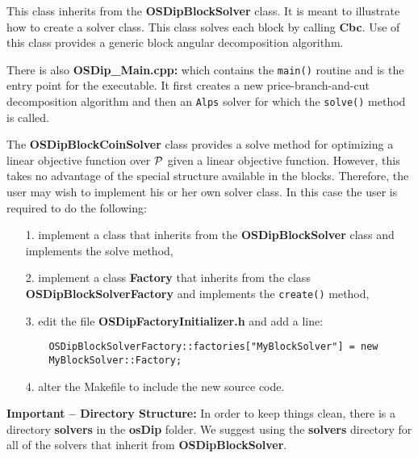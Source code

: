   
\vskip 8pt
  This class inherits from the {\bf
OSDipBlockSolver} class. It is meant to illustrate how to create a solver class.
This class solves each block by calling {\bf Cbc}.  Use of this class provides a
generic block angular decomposition algorithm.



\vskip 8pt
There is also  {\bf OSDip\_Main.cpp:} which contains the {\tt main()} routine and is
the entry point for the executable. It first creates a new price-branch-and-cut
decomposition algorithm and then an {\tt Alps} solver for which the {\tt solve()}
method is called. 


\label{section:userreq}


The {\bf OSDipBlockCoinSolver} class provides a solve method for optimizing a
linear objective function over ${\cal P}$ given a linear objective function.
However, this takes no advantage of the special structure available in the
blocks. Therefore, the user may wish to implement his or her own solver class.
In this case the user is required to do the following:
 
 \begin{itemize}
   
   \item[1.] implement a class that inherits from the {\bf OSDipBlockSolver}
   class and implements the solve method,
   
   \item[2.] implement a class {\bf Factory} that inherits from the class {\bf
OSDipBlockSolverFactory} and implements the {\tt create()} method,

	\item[3.] edit the file {\bf OSDipFactoryInitializer.h} and add a line:
	
	\begin{verbatim}
	OSDipBlockSolverFactory::factories["MyBlockSolver"] = new
	MyBlockSolver::Factory;
	\end{verbatim}
   
   \item[4.] alter the Makefile to include the new source code.
 \end{itemize}
 
 \vskip 8pt
 
 {\bf Important -- Directory Structure:} In order to keep things clean, there is
 a directory {\bf solvers} in the {\bf osDip} folder. We suggest using the {\bf
 solvers} directory for all of the solvers that inherit from {\bf
 OSDipBlockSolver}.
 
